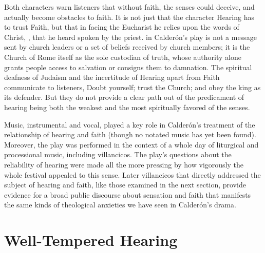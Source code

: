 Both characters warn listeners that without faith, the senses could deceive,
and actually become obstacles to faith.
It is not just that the character Hearing has to trust Faith, but that in
facing the Eucharist he relies upon the words of Christ, , that he heard spoken by the priest.
 in Calderón's play is not a message sent by church leaders
or a set of beliefs received by church members; it is the Church of Rome
itself as the sole custodian of truth, whose authority alone grants people
access to salvation or consigns them to damnation.
The spiritual deafness of Judaism and the incertitude of Hearing apart from
Faith communicate to listeners, Doubt yourself; trust the Church; and obey the
king as its defender.
But they do not provide a clear path out of the predicament of hearing being
both the weakest and the most spiritually favored of the senses.


Music, instrumental and vocal, played a key role in Calderón's treatment of the
relationship of hearing and faith (though no notated music has yet been found).
Moreover, the play was performed in the context of a whole day of liturgical
and processional music, including villancicos.
The play's questions about the reliability of hearing were made all the more
pressing by how vigorously the whole festival appealed to this sense.
Later villancicos that directly addressed the subject of hearing and faith,
like those examined in the next section, provide evidence for a broad public
discourse about sensation and faith that manifests the same kinds of
theological anxieties we have seen in Calderón's drama.


\section{Well-Tempered Hearing}

